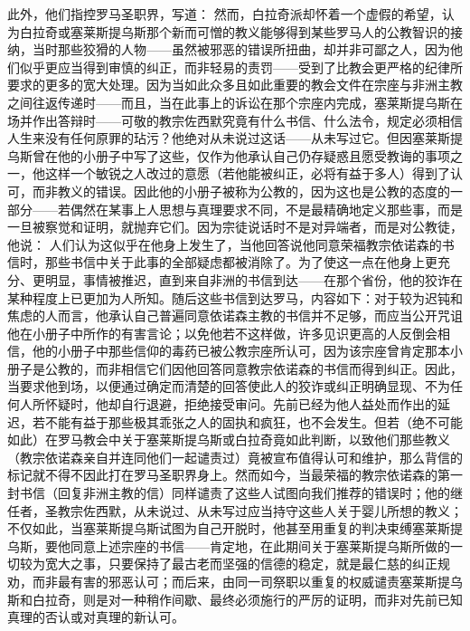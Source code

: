 此外，他们指控罗马圣职界，写道： 然而，白拉奇派却怀着一个虚假的希望，认为白拉奇或塞莱斯提乌斯那个新而可憎的教义能够得到某些罗马人的公教智识的接纳，当时那些狡猾的人物——虽然被邪恶的错误所扭曲，却并非可鄙之人，因为他们似乎更应当得到审慎的纠正，而非轻易的责罚——受到了比教会更严格的纪律所要求的更多的宽大处理。因为当如此众多且如此重要的教会文件在宗座与非洲主教之间往返传递时——而且，当在此事上的诉讼在那个宗座内完成，塞莱斯提乌斯在场并作出答辩时——可敬的教宗佐西默究竟有什么书信、什么法令，规定必须相信人生来没有任何原罪的玷污？他绝对从未说过这话——从未写过它。但因塞莱斯提乌斯曾在他的小册子中写了这些，仅作为他承认自己仍存疑惑且愿受教诲的事项之一，他这样一个敏锐之人改过的意愿（若他能被纠正，必将有益于多人）得到了认可，而非教义的错误。因此他的小册子被称为公教的，因为这也是公教的态度的一部分——若偶然在某事上人思想与真理要求不同，不是最精确地定义那些事，而是一旦被察觉和证明，就抛弃它们。因为宗徒说话时不是对异端者，而是对公教徒，他说：  人们认为这似乎在他身上发生了，当他回答说他同意荣福教宗依诺森的书信时，那些书信中关于此事的全部疑虑都被消除了。为了使这一点在他身上更充分、更明显，事情被推迟，直到来自非洲的书信到达——在那个省份，他的狡诈在某种程度上已更加为人所知。随后这些书信到达罗马，内容如下：对于较为迟钝和焦虑的人而言，他承认自己普遍同意依诺森主教的书信并不足够，而应当公开咒诅他在小册子中所作的有害言论；以免他若不这样做，许多见识更高的人反倒会相信，他的小册子中那些信仰的毒药已被公教宗座所认可，因为该宗座曾肯定那本小册子是公教的，而非相信它们因他回答同意教宗依诺森的书信而得到纠正。因此，当要求他到场，以便通过确定而清楚的回答使此人的狡诈或纠正明确显现、不为任何人所怀疑时，他却自行退避，拒绝接受审问。先前已经为他人益处而作出的延迟，若不能有益于那些极其乖张之人的固执和疯狂，也不会发生。但若（绝不可能如此）在罗马教会中关于塞莱斯提乌斯或白拉奇竟如此判断，以致他们那些教义（教宗依诺森亲自并连同他们一起谴责过）竟被宣布值得认可和维护，那么背信的标记就不得不因此打在罗马圣职界身上。然而如今，当最荣福的教宗依诺森的第一封书信（回复非洲主教的信）同样谴责了这些人试图向我们推荐的错误时；他的继任者，圣教宗佐西默，从未说过、从未写过应当持守这些人关于婴儿所想的教义；不仅如此，当塞莱斯提乌斯试图为自己开脱时，他甚至用重复的判决束缚塞莱斯提乌斯，要他同意上述宗座的书信——肯定地，在此期间关于塞莱斯提乌斯所做的一切较为宽大之事，只要保持了最古老而坚强的信德的稳定，就是最仁慈的纠正规劝，而非最有害的邪恶认可；而后来，由同一司祭职以重复的权威谴责塞莱斯提乌斯和白拉奇，则是对一种稍作间歇、最终必须施行的严厉的证明，而非对先前已知真理的否认或对真理的新认可。\par

